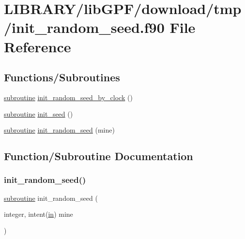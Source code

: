 \hypertarget{init__random__seed_8f90}{}\section{L\+I\+B\+R\+A\+R\+Y/lib\+G\+P\+F/download/tmp/init\+\_\+random\+\_\+seed.f90 File Reference}
\label{init__random__seed_8f90}
\subsection*{Functions/\+Subroutines}
\begin{DoxyCompactItemize}
\item 
\hyperlink{M__stopwatch_83_8txt_acfbcff50169d691ff02d4a123ed70482}{subroutine} \hyperlink{init__random__seed_8f90_ab70ba984a0e7ebaaeba1925ff13f9930}{init\+\_\+random\+\_\+seed\+\_\+by\+\_\+clock} ()
\item 
\hyperlink{M__stopwatch_83_8txt_acfbcff50169d691ff02d4a123ed70482}{subroutine} \hyperlink{init__random__seed_8f90_a81d39fd5bae51e0c5203bd6ff35fc5c5}{init\+\_\+seed} ()
\item 
\hyperlink{M__stopwatch_83_8txt_acfbcff50169d691ff02d4a123ed70482}{subroutine} \hyperlink{init__random__seed_8f90_ad63b6f6af852b2ca337006e5c28508e9}{init\+\_\+random\+\_\+seed} (mine)
\end{DoxyCompactItemize}


\subsection{Function/\+Subroutine Documentation}
\mbox{\label{init__random__seed_8f90_ad63b6f6af852b2ca337006e5c28508e9}} 
\subsubsection{\texorpdfstring{init\+\_\+random\+\_\+seed()}{init\_random\_seed()}}
{\footnotesize\ttfamily \hyperlink{M__stopwatch_83_8txt_acfbcff50169d691ff02d4a123ed70482}{subroutine} init\+\_\+random\+\_\+seed (\begin{DoxyParamCaption}\item[{integer, intent(\hyperlink{M__journal_83_8txt_afce72651d1eed785a2132bee863b2f38}{in})}]{mine }\end{DoxyParamCaption})}

